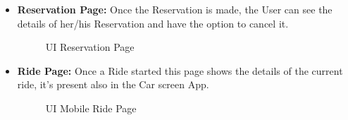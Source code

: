 \documentclass[a4paper]{article}
\begin{document}
\begin {itemize}
\item \textbf{Reservation Page:} Once the Reservation is made, the User can see the details of her/his Reservation and have the option to cancel it.
\begin{figure}[h!]
\centering
\vspace*{\fill}
\noindent{}%
\caption {UI Reservation Page}
\vspace*{0.2cm}
\end{figure}

\item \textbf{Ride Page:} Once a Ride started this page shows the details of the current ride, it's present also in the Car screen App.
\begin{figure}[h!]
\centering
\vspace*{\fill}
\noindent{}%
\caption {UI Mobile Ride Page}
\vspace*{0.2cm}
\end{figure}
\pagebreak


\end{itemize}
\end{document}
